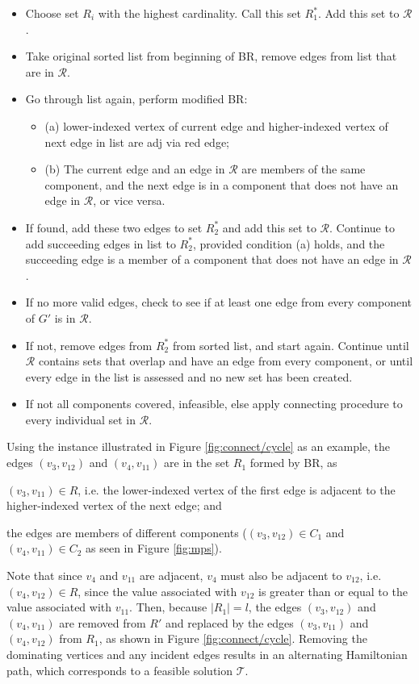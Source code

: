 \documentclass[runningheads]{llncs}
\begin{document}
\begin{itemize}
	\item Choose set $R_i$ with the highest cardinality. Call this set $R^{*}_1$. Add this set to $\mathcal{R}$.
	\item Take original sorted list from beginning of BR, remove edges from list that are in $\mathcal{R}$.
	\item Go through list again, perform modified BR:
	\begin{itemize}
		\item (a) lower-indexed vertex of current edge and higher-indexed vertex of next edge in list are adj via red edge;
		\item (b) The current edge and an edge in $\mathcal{R}$ are members of the same component, and the next edge is in a component that does not have an edge in $\mathcal{R}$, or vice versa.
	\end{itemize}	
	\item If found, add these two edges to set $R^{*}_2$ and add this set to $\mathcal{R}$. Continue to add succeeding edges in list to $R^{*}_2$, provided condition (a) holds, and the succeeding edge is a member of a component that does not have an edge in $\mathcal{R}$.
	\item If no more valid edges, check to see if at least one edge from every component of $G'$ is in $\mathcal{R}$.
	\item If not, remove edges from $R^{*}_2$ from sorted list, and start again. Continue until $\mathcal{R}$ contains sets that overlap and have an edge from every component, or until every edge in the list is assessed and no new set has been created. 
	\item If not all components covered, infeasible, else apply connecting procedure to every individual set in $\mathcal{R}$.
\end{itemize}

Using the instance illustrated in Figure \ref{fig:connect/cycle} as an example, the edges $(v_3, v_{12})$ and $(v_4, v_{11})$ are in the set $R_1$ formed by BR, as \begin{enumerate*}[label={(\alph*)}]
	\item $(v_3, v_{11}) \in R$, i.e. the lower-indexed vertex of the first edge is adjacent to the higher-indexed vertex of the next edge; and
	\item the edges are members of different components ($(v_3, v_{12}) \in C_1$ and $(v_4, v_{11}) \in C_2$ as seen in Figure \ref{fig:mps}).
\end{enumerate*}
Note that since $v_4$ and $v_{11}$ are adjacent, $v_4$ must also be adjacent to $v_{12}$, i.e. $(v_4, v_{12}) \in R$, since the value associated with $v_{12}$ is greater than or equal to the value associated with $v_{11}$. Then, because $|R_1| = l$, the edges $(v_3, v_{12})$ and $(v_4, v_{11})$ are removed from $R'$ and replaced by the edges $(v_3, v_{11})$ and $(v_4, v_{12})$ from $R_1$, as shown in Figure \ref{fig:connect/cycle}. Removing the dominating vertices and any incident edges results in an alternating Hamiltonian path, which corresponds to a feasible solution $\mathcal{T}$. 
\end{document}
